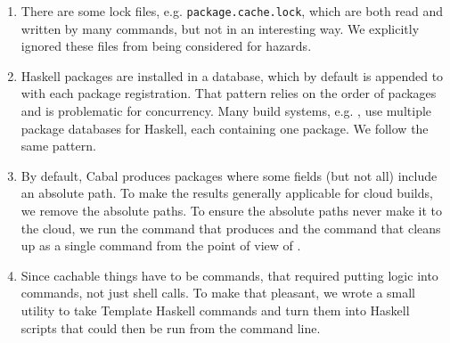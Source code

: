 \begin{enumerate}
\item There are some lock files, e.g. \texttt{package.cache.lock}, which are both read and written by many commands, but not in an interesting way. We explicitly ignored these files from being considered for hazards.
\item Haskell packages are installed in a database, which by default is appended to with each package registration. That pattern relies on the order of packages and is problematic for concurrency. Many build systems, e.g. \Bazel \cite{bazel}, use multiple package databases for Haskell, each containing one package. We follow the same pattern.
\item By default, Cabal produces packages where some fields (but not all) include an absolute path. To make the results generally applicable for cloud builds, we remove the absolute paths. To ensure the absolute paths never make it to the cloud, we run the command that produces and the command that cleans up as a single command from the point of view of \Rattle.
\item Since cachable things have to be commands, that required putting logic into commands, not just shell calls. To make that pleasant, we wrote a small utility to take Template Haskell commands \cite{template_haskell} and turn them into Haskell scripts that could then be run from the command line.
\end{enumerate}

